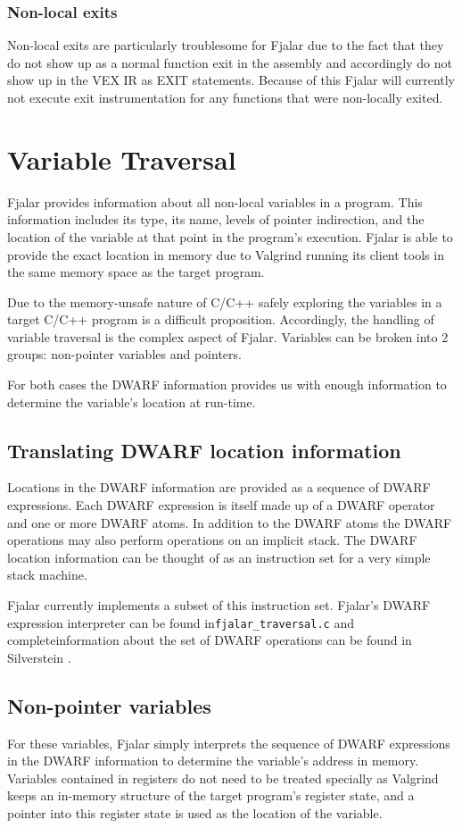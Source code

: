 \documentclass[11pt]{article}
\begin{document}
\subsubsection{Non-local exits}
Non-local exits are particularly troublesome for Fjalar due to the
fact that they do not show up as a normal function exit in the
assembly and accordingly do not show up in the VEX IR as EXIT
statements. Because of this Fjalar will currently not execute exit
instrumentation for any functions that were non-locally exited.

\section{Variable Traversal}
Fjalar provides information about all non-local variables in a
program. This information includes its type, its name, levels of
pointer indirection, and the location of the variable at that point in
the program's execution. Fjalar is able to provide the exact location 
in memory due to Valgrind running its client tools in the same memory
space as the target program.

Due to the memory-unsafe nature of C/C++ safely exploring the
variables in a target C/C++ program is a difficult
proposition. Accordingly, the handling of variable traversal is the
complex aspect of Fjalar. Variables can be broken into 2 groups:
non-pointer variables and pointers.

For both cases the DWARF information provides us with enough
information to determine the variable's location at run-time.

\subsection{Translating DWARF location information}
Locations in the DWARF information are provided as a sequence of DWARF
expressions. Each DWARF expression is itself made up of a DWARF
operator and one or more DWARF atoms. In addition to the DWARF atoms
the DWARF operations may also perform operations on an implicit
stack. The DWARF location information can be thought of as an
instruction set for a very simple stack machine.

Fjalar currently implements a subset of this instruction set. Fjalar's
DWARF expression interpreter can be found
in\texttt{fjalar\_traversal.c} and completeinformation about the set
of DWARF operations can be found in Silverstein
\cite{silverstein1993dwarf}.

\subsection{Non-pointer variables}
For these variables, Fjalar simply interprets the sequence of DWARF
expressions in the DWARF information to determine the variable's
address in memory. Variables contained in registers do not need to be treated
specially as Valgrind keeps an in-memory structure of the target
program's register state, and a pointer into this register state is
used as the location of the variable.
\end{document}
